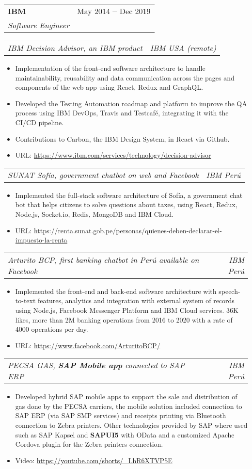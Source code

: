\documentclass[letterpaper,11pt]{article}
\makeatletter
\newcommand{\resumeItem}[1]{
  \item\small{
    {#1 \vspace{-2pt}}
  }
}
\newcommand{\resumeSubheading}[4]{
  \vspace{-4pt}\item
    \begin{tabular*}{0.97\textwidth}[t]{l@{\extracolsep{\fill}}r}
      \textbf{#1} & \small#2 \\
      \textit{\small#3} & \textit{\small #4} \\
    \end{tabular*}\vspace{-7pt}
}
\newcommand{\resumeSubSubheading}[2]{
    \vspace{-2pt}\item
    \begin{tabular*}{0.97\textwidth}{l@{\extracolsep{\fill}}r}
      \textit{\small#1} & \textit{\small #2} \\
    \end{tabular*}\vspace{-7pt}
}
\newcommand{\resumeItemListStart}{\begin{itemize}}
\newcommand{\resumeItemListEnd}{\end{itemize}\vspace{-5pt}}
\makeatother
\begin{document}
    \resumeSubheading
    {IBM}{May 2014 \textbf{--} Dec 2019}
    {Software Engineer}{}
    
      \resumeSubSubheading{IBM Decision Advisor, an IBM product}{IBM USA (remote)}
        \resumeItemListStart
          \resumeItem{Implementation of the front-end software architecture to handle maintainability, reusability and data communication across the pages and components of the web app using React, Redux and GraphQL.}
          \resumeItem{Developed the Testing Automation roadmap and platform to improve the QA process using IBM DevOps, Travis and Testcafé, integrating it with the CI/CD pipeline.}
          \resumeItem{Contributions to Carbon, the IBM Design System, in React via Github.}
          \resumeItem{URL: {\href{https://www.ibm.com/services/technology/decision-advisor}{\color{blue}https://www.ibm.com/services/technology/decision-advisor}}}
        \resumeItemListEnd

      \resumeSubSubheading{SUNAT Sofía, government chatbot on web and Facebook}{IBM Perú}
        \resumeItemListStart
          \resumeItem{Implemented the full-stack software architecture of Sofía, a government chat bot that helps citizens to solve questions about taxes, using React, Redux, Node.js, Socket.io, Redis, MongoDB and IBM Cloud.}
          \resumeItem{URL: {\href{https://renta.sunat.gob.pe/personas/quienes-deben-declarar-el-impuesto-la-renta}{\color{blue}https://renta.sunat.gob.pe/personas/quienes-deben-declarar-el-impuesto-la-renta}}}
        \resumeItemListEnd

      \resumeSubSubheading{Arturito BCP, first banking chatbot in Perú available on Facebook}{IBM Perú}
        \resumeItemListStart
          \resumeItem{Implemented the front-end and back-end software architecture with speech-to-text features, analytics and integration with external system of records using Node.js, Facebook Messenger Platform and IBM Cloud services. 36K likes, more than 2M banking operations from 2016 to 2020 with a rate of 4000 operations per day.}
          \resumeItem{URL: {\href{https://www.facebook.com/ArturitoBCP/}{\color{blue}https://www.facebook.com/ArturitoBCP/}}}
        \resumeItemListEnd

      \resumeSubSubheading{PECSA GAS, \textbf{SAP Mobile app} connected to SAP ERP}{IBM Perú}
        \resumeItemListStart
          \resumeItem{Developed hybrid SAP mobile apps to support the sale and distribution of gas done by the PECSA carriers, the mobile solution included connection to SAP ERP (via SAP SMP services) and receipts printing via Bluetooth connection to Zebra printers. Other technologies provided by SAP where used such as SAP Kapsel and \textbf{SAPUI5} with OData and a customized Apache Cordova plugin for the Zebra printers connection.}
          \resumeItem{Video: {\href{https://youtube.com/shorts/_LhR6XTVP5E}{\color{blue}https://youtube.com/shorts/\_LhR6XTVP5E}}}
        \resumeItemListEnd
\end{document}
